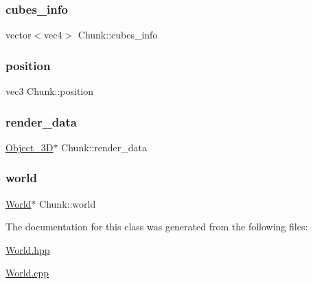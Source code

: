 \mbox{\label{classChunk_acd416e07f98045f3a15354326754cc13}} 
\subsubsection{\texorpdfstring{cubes\+\_\+info}{cubes\_info}}
{\footnotesize\ttfamily vector$<$vec4$>$ Chunk\+::cubes\+\_\+info\hspace{0.3cm}{\ttfamily [private]}}

\mbox{\label{classChunk_a7dd254022526601cff0078424b3c1a9e}} 
\subsubsection{\texorpdfstring{position}{position}}
{\footnotesize\ttfamily vec3 Chunk\+::position}

\mbox{\label{classChunk_a76087b66e157921b725b896b5b254fd0}} 
\subsubsection{\texorpdfstring{render\+\_\+data}{render\_data}}
{\footnotesize\ttfamily \mbox{\hyperlink{classObject__3D}{Object\+\_\+3D}}$\ast$ Chunk\+::render\+\_\+data\hspace{0.3cm}{\ttfamily [private]}}

\mbox{\label{classChunk_aba16bedd07d267d54c85b3c57cd6ca31}} 
\subsubsection{\texorpdfstring{world}{world}}
{\footnotesize\ttfamily \mbox{\hyperlink{classWorld}{World}}$\ast$ Chunk\+::world\hspace{0.3cm}{\ttfamily [private]}}



The documentation for this class was generated from the following files\+:\begin{DoxyCompactItemize}
\item 
\mbox{\hyperlink{World_8hpp}{World.\+hpp}}\item 
\mbox{\hyperlink{World_8cpp}{World.\+cpp}}\end{DoxyCompactItemize}

